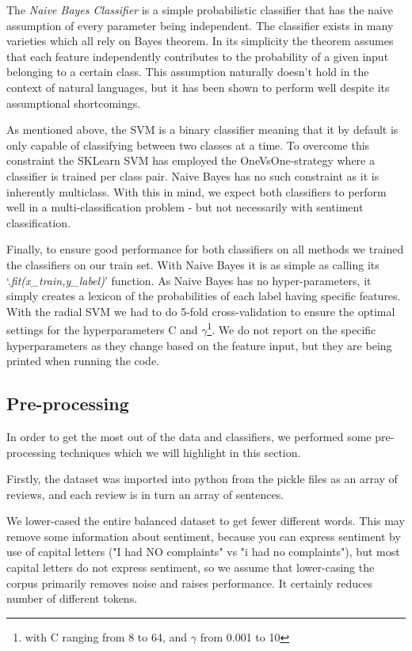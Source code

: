 \documentclass{article}
\begin{document}
The \textit{Naive Bayes Classifier} is a simple probabilistic classifier that has the naive assumption of every parameter being independent. The classifier exists in many varieties which all rely on Bayes theorem. In its simplicity the theorem assumes that each feature independently contributes to the probability of a given input belonging to a certain class. This assumption naturally doesn't hold in the context of natural languages, but it has been shown to perform well despite its assumptional shortcomings\cite{pangetal}\cite{go}. 

As mentioned above, the SVM is a binary classifier meaning that it by default is only capable of classifying between two classes at a time. To overcome this constraint the SKLearn SVM has employed the OneVsOne-strategy where a classifier is trained per class pair.  Naive Bayes has no such constraint as it is inherently multiclass. With this in mind, we expect both classifiers to perform well in a multi-classification problem - but not necessarily with sentiment classification. 

Finally, to ensure good performance for both classifiers on all methods we trained the classifiers on our train set. With Naive Bayes it is as simple as calling its `.\textit{fit(x\_train,y\_label)}' function. As Naive Bayes has no hyper-parameters, it simply creates a lexicon of the probabilities of each label having specific features. With the radial SVM we had to do 5-fold cross-validation to ensure the optimal settings for the hyperparameters C and $\gamma$\footnote{with C ranging from 8 to 64, and $\gamma$ from 0.001 to 10}. We do not report on the specific hyperparameters as they change based on the feature input, but they are being printed when running the code. 

\subsection{Pre-processing}
In order to get the most out of the data and classifiers, we performed some pre-processing techniques which we will highlight in this section. 

Firstly, the dataset was imported into python from the pickle files as an array of reviews, and each review is in turn an array of sentences. 

We lower-cased the entire balanced dataset to get fewer different words. This may remove some information about sentiment, because you can express sentiment by use of capital letters ("I had NO complaints" vs "i had no complaints"), but most capital letters do not express sentiment, so we assume that lower-casing the corpus primarily removes noise and raises performance. It certainly reduces number of different tokens. 
\end{document}
